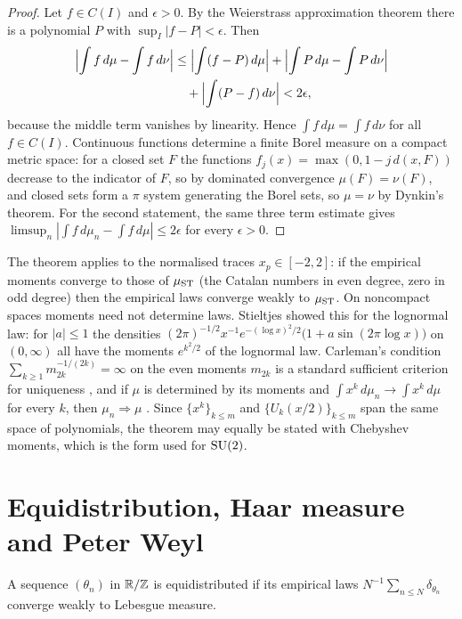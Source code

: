 \begin{proof}
Let $f\in C(I)$ and $\epsilon>0$. By the Weierstrass approximation theorem there is a polynomial $P$ with $\sup_I|f-P|<\epsilon$. Then
\begin{align*}
\Bigl|\int f\,d\mu-\int f\,d\nu\Bigr|&\le\Bigl|\int (f-P)\,d\mu\Bigr|+\Bigl|\int P\,d\mu-\int P\,d\nu\Bigr|\\
&\quad+\Bigl|\int (P-f)\,d\nu\Bigr|<2\epsilon,
\end{align*}
because the middle term vanishes by linearity. Hence $\int f\,d\mu=\int f\,d\nu$ for all $f\in C(I)$. Continuous functions determine a finite Borel measure on a compact metric space: for a closed set $F$ the functions $f_j(x)=\max(0,1-j\,d(x,F))$ decrease to the indicator of $F$, so by dominated convergence $\mu(F)=\nu(F)$, and closed sets form a $\pi$ system generating the Borel sets, so $\mu=\nu$ by Dynkin's theorem. For the second statement, the same three term estimate gives $\limsup_n|\int f\,d\mu_n-\int f\,d\mu|\le2\epsilon$ for every $\epsilon>0$.
\end{proof}

The theorem applies to the normalised traces $x_p\in[-2,2]$: if the empirical moments converge to those of $\mu_{\mathrm{ST}}$ (the Catalan numbers in even degree, zero in odd degree) then the empirical laws converge weakly to $\mu_{\mathrm{ST}}$. On noncompact spaces moments need not determine laws. Stieltjes \cite{stieltjes1894} showed this for the lognormal law: for $|a|\le1$ the densities $(2\pi)^{-1/2}x^{-1}e^{-(\log x)^2/2}\bigl(1+a\sin(2\pi\log x)\bigr)$ on $(0,\infty)$ all have the moments $e^{k^2/2}$ of the lognormal law. Carleman's condition $\sum_{k\ge1}m_{2k}^{-1/(2k)}=\infty$ on the even moments $m_{2k}$ is a standard sufficient criterion for uniqueness \cite{akhiezer1965}, and if $\mu$ is determined by its moments and $\int x^k\,d\mu_n\to\int x^k\,d\mu$ for every $k$, then $\mu_n\Rightarrow\mu$ \cite{billingsley1995}. Since $\{x^k\}_{k\le m}$ and $\{U_k(x/2)\}_{k\le m}$ span the same space of polynomials, the theorem may equally be stated with Chebyshev moments, which is the form used for $\mathrm{SU}(2)$.

\section{Equidistribution, Haar measure and Peter Weyl}

A sequence $(\theta_n)$ in $\mathbb{R}/\mathbb{Z}$ is equidistributed if its empirical laws $N^{-1}\sum_{n\le N}\delta_{\theta_n}$ converge weakly to Lebesgue measure.

